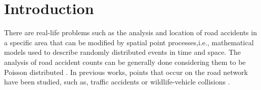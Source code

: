 \chapter{Introduction} \label{ch:intro}

There are real-life problems such as the analysis and location of road accidents in a specific area that can be modified by spatial point processes,i.e., mathematical models used to describe randomly distributed events in time and space. The analysis of road accident counts can be generally done considering them to be Poisson distributed \cite{car-poisson}. In previous works, points that occur on the road network have been studied, such as, traffic accidents \cite{yamada} or wildlife-vehicle collisions \cite{borrajo}.

